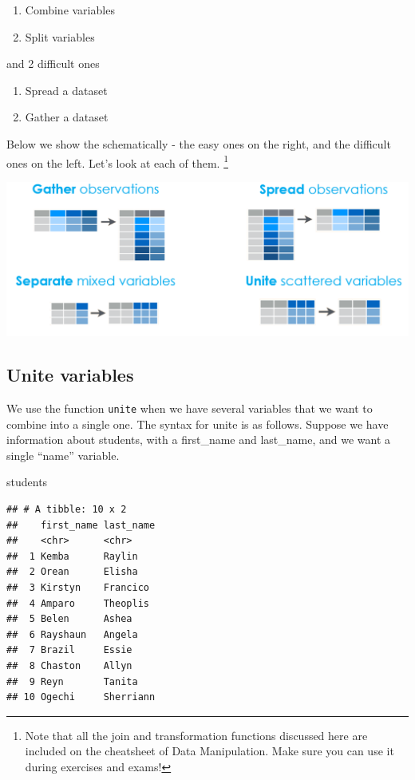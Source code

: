\documentclass[]{tufte-book}
\newenvironment{Shaded}{}{}
\newcommand{\NormalTok}[1]{#1}
\providecommand{\tightlist}{%
  \setlength{\itemsep}{0pt}\setlength{\parskip}{0pt}}
\begin{document}
\begin{enumerate}
\def\labelenumi{\arabic{enumi}.}
\tightlist
\item
  Combine variables
\item
  Split variables
\end{enumerate}

and 2 difficult ones

\begin{enumerate}
\def\labelenumi{\arabic{enumi}.}
\setcounter{enumi}{2}
\tightlist
\item
  Spread a dataset
\item
  Gather a dataset
\end{enumerate}

Below we show the schematically - the easy ones on the right, and the difficult ones on the left. Let's look at each of them. \footnote{Note that all the join and transformation functions discussed here are included on the cheatsheet of Data Manipulation. Make sure you can use it during exercises and exams!}

\includegraphics[width=1\linewidth]{images/operations2}

\hypertarget{unite-variables}{%
\subsection{Unite variables}\label{unite-variables}}

We use the function \texttt{unite} when we have several variables that we want to combine into a single one. The syntax for unite is as follows. Suppose we have information about students, with a first\_name and last\_name, and we want a single ``name'' variable.

\begin{Shaded}
\begin{Highlighting}[]
\NormalTok{students}
\end{Highlighting}
\end{Shaded}

\begin{verbatim}
## # A tibble: 10 x 2
##    first_name last_name
##    <chr>      <chr>    
##  1 Kemba      Raylin   
##  2 Orean      Elisha   
##  3 Kirstyn    Francico 
##  4 Amparo     Theoplis 
##  5 Belen      Ashea    
##  6 Rayshaun   Angela   
##  7 Brazil     Essie    
##  8 Chaston    Allyn    
##  9 Reyn       Tanita   
## 10 Ogechi     Sherriann
\end{verbatim}
\end{document}
